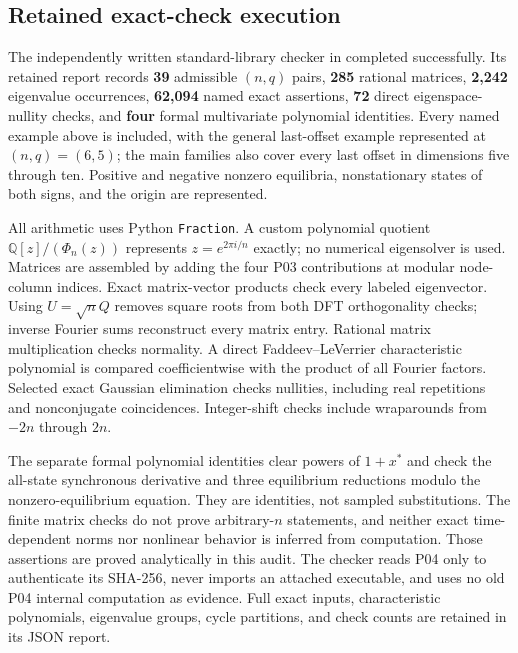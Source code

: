 \documentclass[11pt]{article}
\begin{document}
\subsection{Retained exact-check execution}
The independently written standard-library checker in
 completed successfully.
Its retained report records \textbf{39} admissible $(n,q)$ pairs,
\textbf{285} rational matrices, \textbf{2,242} eigenvalue occurrences,
\textbf{62,094} named exact assertions, \textbf{72} direct eigenspace-nullity
checks, and \textbf{four} formal multivariate polynomial identities.
Every named example above is included, with the general last-offset example
represented at $(n,q)=(6,5)$; the main families also cover every last offset
in dimensions five through ten. Positive and negative nonzero equilibria,
nonstationary states of both signs, and the origin are represented.

All arithmetic uses Python \texttt{Fraction}. A custom polynomial quotient
$\mathbb Q[z]/(\Phi_n(z))$ represents $z=e^{2\pi i/n}$ exactly; no numerical
eigensolver is used. Matrices are assembled by adding the four P03
contributions at modular node-column indices. Exact matrix-vector products
check every labeled eigenvector. Using $U=\sqrt n Q$ removes square roots
from both DFT orthogonality checks; inverse Fourier sums reconstruct every
matrix entry. Rational matrix multiplication checks normality. A direct
Faddeev--LeVerrier characteristic polynomial is compared coefficientwise
with the product of all Fourier factors. Selected exact Gaussian elimination
checks nullities, including real repetitions and nonconjugate coincidences.
Integer-shift checks include wraparounds from $-2n$ through $2n$.

The separate formal polynomial identities clear powers of $1+x^*$ and
check the all-state synchronous derivative and three equilibrium reductions
modulo the nonzero-equilibrium equation. They are identities, not sampled
substitutions. The finite matrix checks do not prove arbitrary-$n$ statements,
and neither exact time-dependent norms nor nonlinear behavior is inferred
from computation. Those assertions are proved analytically in this audit.
The checker reads P04 only to authenticate its SHA-256, never imports an
attached executable, and uses no old P04 internal computation as evidence.
Full exact inputs, characteristic polynomials, eigenvalue groups, cycle
partitions, and check counts are retained in its JSON report.
\end{document}
